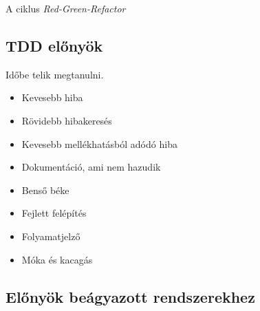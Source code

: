 \begin{frame}{A ciklus}
  \textit{Red-Green-Refactor}
\end{frame}

\subsection{TDD előnyök}

\begin{frame}
  Időbe telik megtanulni.

  \pause

  \begin{itemize}[<+->]
  \item Kevesebb hiba
  \item Rövidebb hibakeresés
  \item Kevesebb mellékhatásból adódó hiba
  \item Dokumentáció, ami nem hazudik
  \item Benső béke
  \item Fejlett felépítés
  \item Folyamatjelző
  \item Móka és kacagás
  \end{itemize}

\end{frame}

\subsection{Előnyök beágyazott rendszerekhez}



